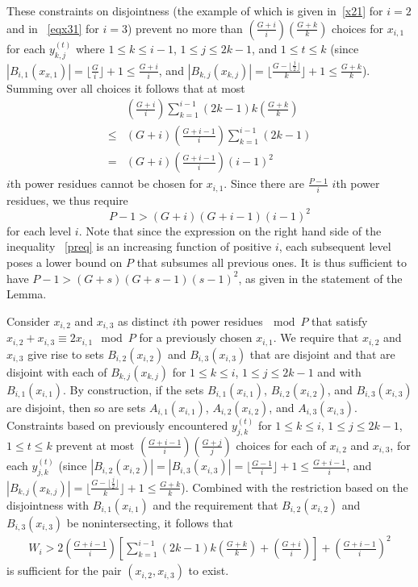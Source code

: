 These  constraints on disjointness (the example of which is given
in~\eqref{x21} for $i=2$ and in ~\eqref{eqx31} for $i=3$) prevent
no more than $(\frac{G+i}{i})(\frac{G+k}{k})$ choices for
$x_{i,1}$  for each $y_{k,j}^{(t)}$ where $1 \leq k \leq i-1$, $1
\leq j \leq 2k-1$, and $1 \leq t \leq k$ (since
$|B_{i,1}(x_{x,1})|=\lfloor \frac{G}{i} \rfloor+1 \leq
\frac{G+i}{i}$, and $|B_{k,j}(x_{k,j})|=\lfloor \frac{G-\lfloor
\frac{j}{2}\rfloor}{k} \rfloor+1 \leq \frac{G+k}{k}$). Summing
over all choices it follows that at most
\begin{equation}\begin{array}{lll}{}& \left(\frac{G+i}{i}\right) \sum_{k=1}^{i-1}
(2k-1)k\left(\frac{G+k}{k}\right)\\\leq&
(G+i)\left(\frac{G+i-1}{i}\right) \sum_{k=1}^{i-1}
(2k-1)\\=&(G+i)\left(\frac{G+i-1}{i}\right)(i-1)^2
\end{array}\end{equation} $i$th power residues cannot be chosen for
$x_{i,1}$. Since there are $\frac{P-1}{i}$ $i$th power residues,
we thus require
\begin{equation}\label{preq}
P-1 > (G+i)(G+i-1)(i-1)^2
\end{equation}
for each level $i$. Note that since the expression on the right
hand side of the inequality ~\eqref{preq} is an increasing
function of positive $i$, each subsequent level poses a lower
bound on $P$ that subsumes all previous ones. It is thus
sufficient to have $P-1
> (G+s)(G+s-1)(s-1)^2$, as given in the statement of the Lemma.

Consider $x_{i,2}$ and $x_{i,3}$ as distinct $i$th power
residues$~\mod P$ that satisfy $x_{i,2}+ x_{i,3} \equiv 2x_{i,1}
\mod P$ for a previously chosen $x_{i,1}$. We require that
 $x_{i,2}$ and $x_{i,3}$ give rise to sets $B_{i,2}(x_{i,2})$ and
$B_{i,3}(x_{i,3})$ that are disjoint and that are disjoint with
each of $B_{k,j}(x_{k,j})$ for $1\leq k \leq i$, $1\leq j \leq
2k-1$ and with $B_{i,1}(x_{i,1})$. By construction, if the sets
$B_{i,1}(x_{i,1})$, $B_{i,2}(x_{i,2})$, and $B_{i,3}(x_{i,3})$ are
disjoint, then so are sets $A_{i,1}(x_{i,1})$, $A_{i,2}(x_{i,2})$,
and $A_{i,3}(x_{i,3})$. Constraints based on previously
encountered $y_{j,k}^{(t)}$ for $1\leq k \leq i$, $1\leq j \leq
2k-1$, $1 \leq t \leq k$ prevent at most
$(\frac{G+i-1}{i})(\frac{G+j}{j})$ choices for each of $x_{i,2}$
and $x_{i,3}$, for each $y_{j,k}^{(t)}$ (since
$|B_{i,2}(x_{i,2})|=|B_{i,3}(x_{i,3})|= \lfloor \frac{G-1}{i}
\rfloor+1 \leq \frac{G+i-1}{i}$, and $|B_{k,j}(x_{k,j})|=\lfloor
\frac{G-\lfloor \frac{j}{2}\rfloor}{k} \rfloor+1 \leq
\frac{G+k}{k}$). Combined with the restriction based on the
disjointness with $B_{i,1}(x_{i,1})$ and the requirement that
$B_{i,2}(x_{i,2})$ and $B_{i,3}(x_{i,3})$ be nonintersecting, it
follows that
\begin{equation}\begin{array}{lll} W_i>
2\left(\frac{G+i-1}{i}\right) \left[\sum_{k=1}^{i-1}
(2k-1)k(\frac{G+k}{k})+\left( \frac{G+i}{i}\right)\right]+\left(
\frac{G+i-1}{i}\right)^2
\end{array}\end{equation}
is sufficient for the pair $(x_{i,2},x_{i,3})$ to exist.

